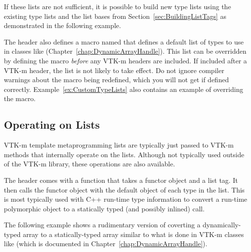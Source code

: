 If these lists are not sufficient, it is possible to build new type lists
using the existing type lists and the list bases from
Section~\ref{sec:BuildingListTags} as demonstrated in the following
example.


The  header also defines a macro named
 that defines a default list of
types to use in classes like 
(Chapter~\ref{chap:DynamicArrayHandle}). This list can be overridden by
defining the  macro \emph{before}
any VTK-m headers are included. If included after a VTK-m header, the list
is not likely to take effect. Do not ignore compiler warnings about the
macro being redefined, which you will not get if defined
correctly. Example~\ref{ex:CustomTypeLists} also contains an example of
overriding the  macro.


\subsection{Operating on Lists}
\label{sec:OperatingOnLists}

VTK-m template metaprogramming lists are typically just passed to VTK-m
methods that internally operate on the lists. Although not typically used
outside of the VTK-m library, these operations are also available.

The  header comes with a 
function that takes a functor object and a list tag. It then calls the
functor object with the default object of each type in the list. This is
most typically used with C++ run-time type information to convert a
run-time polymorphic object to a statically typed (and possibly inlined)
call.

The following example shows a rudimentary version of coverting a
dynamically-typed array to a statically-typed array similar to what is done
in VTK-m classes like  (which is documented in
Chapter~\ref{chap:DynamicArrayHandle}).




